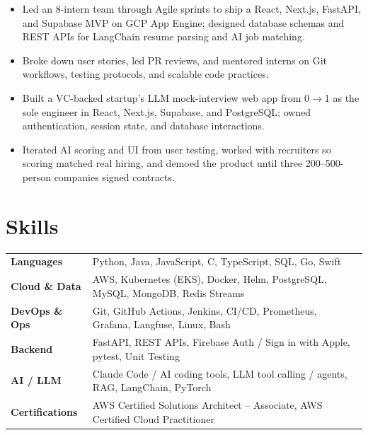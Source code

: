 \documentclass[11pt, letterpaper]{article}
\begin{document}
\begin{itemize}
  \item Led an 8-intern team through Agile sprints to ship a React, Next.js, FastAPI, and Supabase MVP on GCP App Engine; designed database schemas and REST APIs for LangChain resume parsing and AI job matching.
  \item Broke down user stories, led PR reviews, and mentored interns on Git workflows, testing protocols, and scalable code practices.
\end{itemize}

\begin{itemize}
  \item Built a VC-backed startup's LLM mock-interview web app from 0$\to$1 as the sole engineer in React, Next.js, Supabase, and PostgreSQL; owned authentication, session state, and database interactions.
  \item Iterated AI scoring and UI from user testing, worked with recruiters so scoring matched real hiring, and demoed the product until three 200--500-person companies signed contracts.
\end{itemize}

\section{Skills}
\begin{tabularx}{\textwidth}{@{}l @{\hspace{7pt}} >{\raggedright\arraybackslash}X@{}}
  \textbf{Languages} & Python, Java, JavaScript, C, TypeScript, SQL, Go, Swift \\[1pt]
  \textbf{Cloud \& Data} & AWS, Kubernetes (EKS), Docker, Helm, PostgreSQL, MySQL, MongoDB, Redis Streams \\[1pt]
  \textbf{DevOps \& Ops} & Git, GitHub Actions, Jenkins, CI/CD, Prometheus, Grafana, Langfuse, Linux, Bash \\[1pt]
  \textbf{Backend} & FastAPI, REST APIs, Firebase Auth / Sign in with Apple, pytest, Unit Testing \\[1pt]
  \textbf{AI / LLM} & Claude Code / AI coding tools, LLM tool calling / agents, RAG, LangChain, PyTorch \\[1pt]
  \textbf{Certifications} & AWS Certified Solutions Architect -- Associate, AWS Certified Cloud Practitioner \\
\end{tabularx}
\end{document}
